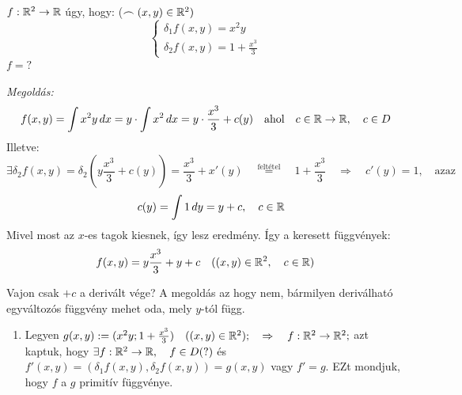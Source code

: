 \documentclass[a4paper,11.5pt]{article}
\begin{document}
	\begin{task}$f:\mathbb{R}^2\to\mathbb{R}$ úgy, hogy: \quad ($\frown(x,y)\in\mathbb{R}^2)$
		\[ \begin{cases}
			\delta_1f(x,y)=x^2y\\
			\delta_2f(x,y)=1+\frac{x^3}{3}
		\end{cases} \]
		$f=?$
		
		\textit{Megoldás:} 
		\[f(x,y)=\int x^2y\,dx =y\cdot\int x^2\,dx=y\cdot\frac{x^3}{3}+c(y)\quad \text{ahol}\quad c\in\mathbb{R}\to\mathbb{R},\quad c\in D \]
		Illetve:
		\[ \exists\delta_2f(x,y)=\delta_2\left(y\frac{x^3}{3}+c(y)\right)=\frac{x^3}{3}+x'(y)\quad \overset{\text{feltétel}}{=}\quad 1+\frac{x^3}{3}\quad \Rightarrow\quad c'(y)=1, \quad \text{azaz}\]
		\[\quad c(y)=\int1\,dy=y+c, \quad c\in\mathbb{R} \]
		Mivel most az $x$-es tagok kiesnek, így lesz eredmény. 
		Így a keresett függvények:
		\[ f(x,y)=y\frac{x^3}{3}+y+c\quad ((x,y)\in\mathbb{R}^2,\quad c\in\mathbb{R}) \]
	\end{task}
	\begin{note}
		Vajon csak $+c$ a derivált vége? A megoldás az hogy nem, bármilyen deriválható egyváltozós függvény mehet oda, mely $y$-tól függ.
	\end{note}
	\begin{note}
		\begin{enumerate}
			\item Legyen $g(x,y):=(x^2y;1+\frac{x^3}{3})\quad ((x,y)\in\mathbb{R}^2);\quad \Rightarrow\quad f:\mathbb{R}^2\to\mathbb{R}^2;$ azt kaptuk, hogy $\exists f:\mathbb{R}^2\to\mathbb{R},\quad f\in D (?)$ és $f'(x,y)=(\delta_1f(x,y),\delta_2f(x,y))=g(x,y)$ vagy $f'=g$. EZt mondjuk, hogy $f$ a $g$ primitív függvénye.
		\end{enumerate}
	\end{note}
\end{document}
